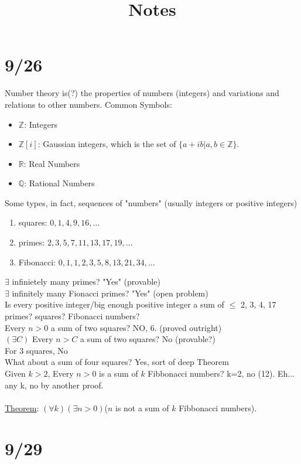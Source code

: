 \documentclass[13pt]{article}
\title{Notes}
\begin{document}
\maketitle

\section*{9/26}
	Number theory is(?) the properties of numbers (integers) and variations and relations to other numbers.
	Common Symbols:\\
	\begin{itemize}
		\item $\mathbb{Z}$: Integers
		\item $\mathbb{Z}[i]$: Gaussian integers, which is the set of $\{a + ib | a,b \in \mathbb{Z}\}$.
		\item $\mathbb{R}$: Real Numbers
		\item $\mathbb{Q}$: Rational Numbers
	\end{itemize}
	Some types, in fact, sequences of "numbers" (usually integers or positive integers)  
	\begin{enumerate}
		\item squares: $0, 1, 4, 9, 16, \ldots$
		\item primes: $2, 3, 5, 7, 11, 13, 17, 19, \ldots$
		\item Fibonacci: $0, 1, 1, 2, 3, 5, 8, 13, 21, 34, \ldots$
	\end{enumerate}
	$\exists$ infinietely many primes? "Yes" (provable)\\
	$\exists$ infinitely many Fionacci primes? "Yes" (open problem)\\
	Is every positive integer/big enough positive integer a sum of $\le$ 2, 3, 4, 17 primes? squares? Fibonacci numbers? \\
	Every $n>0$ a sum of two squares? NO, 6. (proved outright)\\
	$(\exists C)$ Every $n > C$ a sum of two squares? No (provable?)\\
	For 3 squares, No \\
	What about a sum of four squares? Yes, sort of deep Theorem \\
	Given $k > 2$, Every $n > 0$ is a sum of $k$ Fibbonacci numbers? k=2, no (12). Eh... any k, no by another proof. \\\\
	\underline{Theorem}: $(\forall k)(\exists n > 0)$($n$ is not a sum of $k$ Fibbonacci numbers).

\section*{9/29}
\end{document}
